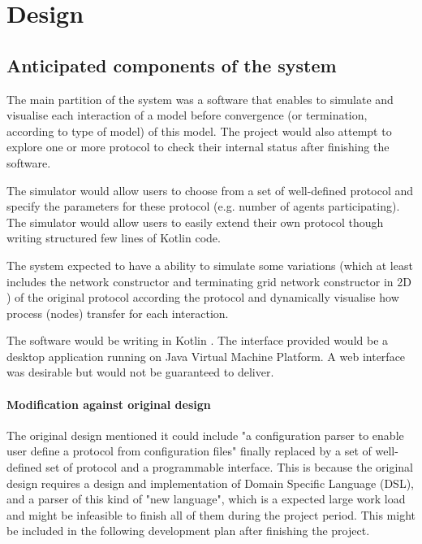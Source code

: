 \section{Design} \label{design}
\subsection{Anticipated components of the system}
\par\noindent
The main partition of the system was a software that enables to simulate
and visualise each interaction of a model before convergence (or termination, according to type of model) of this model. The project
would also attempt to explore one or more protocol to check their internal
status after finishing the software.

\par\noindent
The simulator would allow users to choose from a set of well-defined protocol and
specify the parameters for these protocol (e.g. number of agents participating).
The simulator would allow users to easily extend their own protocol though writing
structured few lines of Kotlin \cite{Kotlin} code.

\par\noindent
The system expected to have a ability to simulate some variations (which at
least includes the network constructor \cite{MS16a} and terminating grid network constructor in 2D \cite{Mi17})
of the original protocol according the protocol and dynamically visualise how process (nodes) transfer for each interaction.

\par\noindent
The software would be writing in Kotlin  \cite{Kotlin}. The interface provided would be a desktop application running on Java Virtual Machine Platform.
A web interface was desirable but would not be guaranteed to deliver.

\paragraph{Modification against original design} The original design mentioned it could include "a configuration parser to
  enable user define a protocol from configuration files" finally replaced by a set of
  well-defined set of protocol and a programmable interface. This is because the
  original design requires a design and implementation of Domain Specific Language (DSL),
  and a parser of this kind of "new language", which is a expected large work load and might be
  infeasible to finish all of them
  during the project period. This might be included in the following development plan
  after finishing the project.

